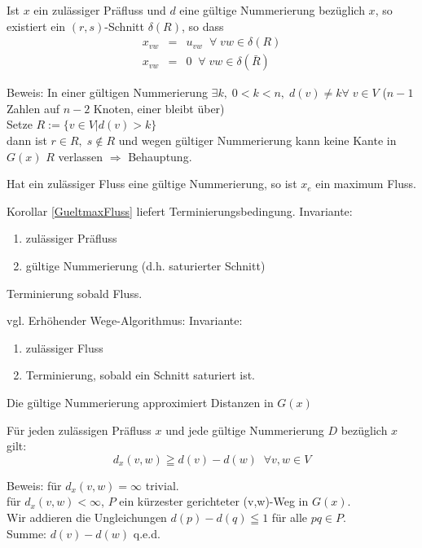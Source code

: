 \begin{lemma}
Ist $x$ ein zulässiger Präfluss und $d$ eine gültige Nummerierung bezüglich
$x$, so existiert ein $(r,s)$-Schnitt $\delta(R)$, so dass\\
\[\begin{array}{rcl}
x_{v w}&=& u_{v w} \; \; \forall \; v w \in \delta(R)\\
x_{v w}&=& 0 \; \; \forall \; v w \in \delta(\bar{R})
\end{array}\]
\end{lemma}
Beweis: In einer gültigen Nummerierung $\exists k, \; 0 < k < n, \; d(v)
\not= k \forall \; v \in V$ ($n-1$ Zahlen auf $n-2$ Knoten, einer bleibt
über)\\
Setze $R:= \{v \in V | d(v) > k\}$\\
dann ist $r \in R, \; s \not\in R$ und wegen gültiger Nummerierung kann
keine Kante in $G(x)$ $R$ verlassen $\Rightarrow$ Behauptung.

\begin{korollar}\label{GueltmaxFluss}
Hat ein zulässiger Fluss eine gültige Nummerierung, so ist $x_{e}$ ein
maximum Fluss.
\end{korollar}
Korollar \ref{GueltmaxFluss} liefert Terminierungsbedingung.
Invariante:
\begin{enumerate}
\item zulässiger Präfluss
\item gültige Nummerierung (d.h. saturierter Schnitt)
\end{enumerate} 
Terminierung sobald Fluss.

vgl. Erhöhender Wege-Algorithmus:
Invariante:
\begin{enumerate}
\item zulässiger Fluss
\item Terminierung, sobald ein Schnitt saturiert ist.
\end{enumerate}
Die gültige Nummerierung approximiert Distanzen in $G(x)$
\begin{lemma}
Für jeden zulässigen Präfluss $x$ und jede gültige Nummerierung $D$
bezüglich $x$ gilt:
\[d_{x}(v,w) \geqq d(v) - d(w) \; \; \forall v, w \in V\]
\end{lemma}
Beweis: für $d_{x}(v,w) = \infty$ trivial.\\
für $d_{x}(v,w) < \infty$, $P$ ein kürzester gerichteter (v,w)-Weg in
$G(x)$.\\
Wir addieren die Ungleichungen $d(p) - d(q) \leqq 1$ für alle $p q \in P$.
\\ Summe: $d(v) - d(w)$ q.e.d.

